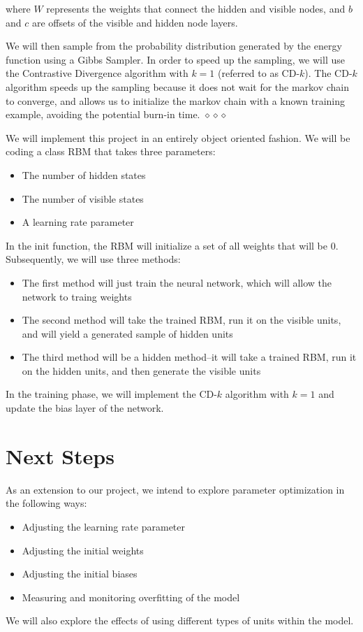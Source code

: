 \documentclass[12pt]{article}
\begin{document}
where $W$ represents the weights that connect the hidden and visible nodes, and $b$ and $c$ are offsets of the visible and hidden node layers. 

We will then sample from the probability distribution generated by the energy function using a Gibbs Sampler. In order to speed up the sampling, we will use the Contrastive Divergence algorithm with $k=1$ (referred to as CD-$k$). The CD-$k$ algorithm speeds up the sampling because it does not wait for the markov chain to converge, and allows us to initialize the markov chain with a known training example, avoiding the potential burn-in time. $\diamond \diamond \diamond$

We will implement this project in an entirely object oriented fashion. We will be coding a class RBM that takes three parameters:
\begin{itemize}
  \item The number of hidden states
  \item The number of visible states
  \item A learning rate parameter
\end{itemize}

In the init function, the RBM will initialize a set of all weights that will be 0. Subsequently, we will use three methods:
\begin{itemize}
  \item The first method will just train the neural network, which will allow the network to traing weights
  \item The second method will take the trained RBM, run it on the visible units, and will yield a generated sample of hidden units
  \item The third method will be a hidden method--it will take a trained RBM, run it on the hidden units, and then generate the visible units
\end{itemize}

In the training phase, we will implement the CD-$k$ algorithm with $k = 1$ and update the bias layer of the network. 

\section{Next Steps}

As an extension to our project, we intend to explore parameter optimization in the following ways:
\begin{itemize}
  \item Adjusting the learning rate parameter
  \item Adjusting the initial weights 
  \item Adjusting the initial biases
  \item Measuring and monitoring overfitting of the model
\end{itemize}

We will also explore the effects of using different types of units within the model. 
\end{document}
